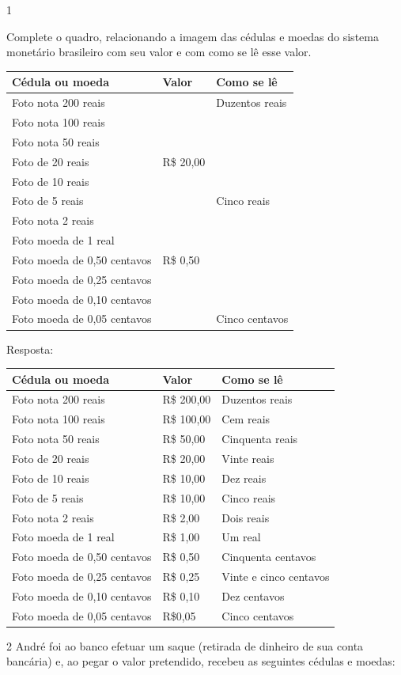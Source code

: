 \begin{multicols}{2}

\num{1}

Complete o quadro, relacionando a imagem das cédulas e moedas do
sistema monetário brasileiro com seu valor e com como se lê esse valor.


\begin{longtable}[]{@{}lll@{}}
\toprule
Cédula ou moeda & Valor & Como se lê\tabularnewline
\midrule
\endhead
Foto nota 200 reais & & Duzentos reais\tabularnewline
Foto nota 100 reais & &\tabularnewline
Foto nota 50 reais & &\tabularnewline
Foto de 20 reais & R\$ 20,00 &\tabularnewline
Foto de 10 reais & &\tabularnewline
Foto de 5 reais & & Cinco reais\tabularnewline
Foto nota 2 reais & &\tabularnewline
Foto moeda de 1 real & &\tabularnewline
Foto moeda de 0,50 centavos & R\$ 0,50 &\tabularnewline
Foto moeda de 0,25 centavos & &\tabularnewline
Foto moeda de 0,10 centavos & &\tabularnewline
Foto moeda de 0,05 centavos & & Cinco centavos\tabularnewline
\bottomrule
\end{longtable}

Resposta:

\begin{longtable}[]{@{}lll@{}}
\toprule
Cédula ou moeda & Valor & Como se lê\tabularnewline
\midrule
\endhead
Foto nota 200 reais & R\$ 200,00 & Duzentos reais\tabularnewline
Foto nota 100 reais & R\$ 100,00 & Cem reais\tabularnewline
Foto nota 50 reais & R\$ 50,00 & Cinquenta reais\tabularnewline
Foto de 20 reais & R\$ 20,00 & Vinte reais\tabularnewline
Foto de 10 reais & R\$ 10,00 & Dez reais\tabularnewline
Foto de 5 reais & R\$ 10,00 & Cinco reais\tabularnewline
Foto nota 2 reais & R\$ 2,00 & Dois reais\tabularnewline
Foto moeda de 1 real & R\$ 1,00 & Um real\tabularnewline
Foto moeda de 0,50 centavos & R\$ 0,50 & Cinquenta
centavos\tabularnewline
Foto moeda de 0,25 centavos & R\$ 0,25 & Vinte e cinco
centavos\tabularnewline
Foto moeda de 0,10 centavos & R\$ 0,10 & Dez centavos\tabularnewline
Foto moeda de 0,05 centavos & R\$0,05 & Cinco centavos\tabularnewline
\bottomrule
\end{longtable}

\num{2} André foi ao banco efetuar um saque (retirada de dinheiro de sua conta
bancária) e, ao pegar o valor pretendido, recebeu as seguintes cédulas e moedas:



\end{multicols}
